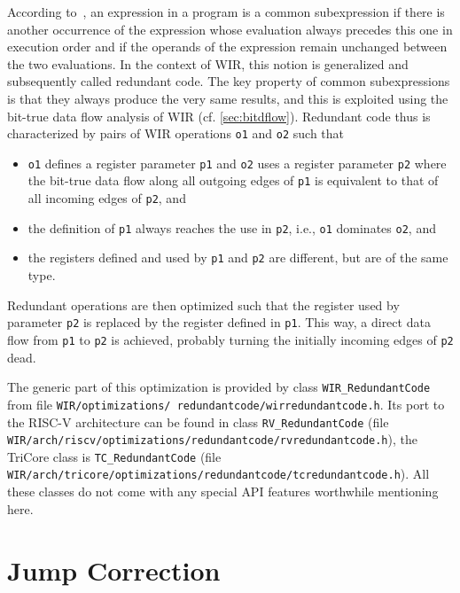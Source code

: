 According to~\cite[chapter~13.1]{Much97}, an expression in a program is a common subexpression if there is another occurrence of the expression whose evaluation always precedes this one in execution order and if the operands of the expression remain unchanged between the two evaluations.
In the context of \gls{WIR}, this notion is generalized and subsequently called redundant code.
The key property of common subexpressions is that they always produce the very same results, and this is exploited using the bit-true data flow analysis of \gls{WIR} (cf. \cref{sec:bitdflow}).
Redundant code thus is characterized by pairs of \gls{WIR} operations \texttt{o1} and \texttt{o2} such that
\begin{itemize}
  \item \texttt{o1} defines a register parameter \texttt{p1} and \texttt{o2} uses a register parameter \texttt{p2} where the bit-true data flow along all outgoing edges of \texttt{p1} is equivalent to that of all incoming edges of \texttt{p2}, and
  \item the definition of \texttt{p1} always reaches the use in \texttt{p2}, i.e., \texttt{o1} dominates \texttt{o2}, and
  \item the registers defined and used by \texttt{p1} and \texttt{p2} are different, but are of the same type.
\end{itemize}
Redundant operations are then optimized such that the register used by parameter \texttt{p2} is replaced by the register defined in \texttt{p1}.
This way, a direct data flow from \texttt{p1} to \texttt{p2} is achieved, probably turning the initially incoming edges of \texttt{p2} dead.

The generic part of this optimization is provided by class \texttt{WIR\_RedundantCode} from file \texttt{WIR/optimizations/ redundantcode/wirredundantcode.h}.
Its port to the RISC-V architecture can be found in class \texttt{RV\_Re\-dun\-dant\-Code} (file \texttt{WIR/arch/riscv/optimizations/redundantcode/rvredundantcode.h}), the Tri\-Core class is \texttt{TC\_Re\-dundantCode} (file \texttt{WIR/arch/tricore/optimizations/redundantcode/tcredundantcode.h}).
All these classes do not come with any special \gls{API} features worthwhile mentioning here.


\section{Jump Correction}
\label{sec:optjumps}

